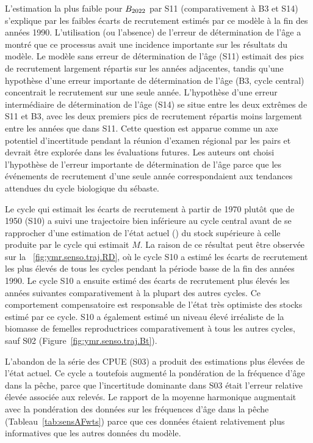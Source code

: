\documentclass[11pt]{book}
\begin{document}
L'estimation la plus faible pour $B_{2022}$ par S11 (comparativement \`{a} B3 et S14) s'explique par les faibles \'{e}carts de recrutement estim\'{e}s par ce mod\`{e}le \`{a} la fin des ann\'{e}es 1990.
L'utilisation (ou l'absence) de l'erreur de d\'{e}termination de l'\^{a}ge a montr\'{e} que ce processus avait une incidence importante sur les r\'{e}sultats du mod\`{e}le. 
Le mod\`{e}le sans erreur de d\'{e}termination de l'\^{a}ge (S11) estimait des pics de recrutement largement r\'{e}partis sur les ann\'{e}es adjacentes, tandis qu'une hypoth\`{e}se d'une erreur importante de d\'{e}termination de l'\^{a}ge (B3, cycle central) concentrait le recrutement sur une seule ann\'{e}e. L'hypoth\`{e}se d'une erreur interm\'{e}diaire de d\'{e}termination de l'\^{a}ge (S14) se situe entre les deux extr\^{e}mes de S11 et B3, avec les deux premiers pics de recrutement r\'{e}partis moins largement entre les ann\'{e}es que dans S11.
Cette question est apparue comme un axe potentiel d'incertitude pendant la r\'{e}union d'examen r\'{e}gional par les pairs et devrait \^{e}tre explor\'{e}e dans les \'{e}valuations futures. Les auteurs ont choisi l'hypoth\`{e}se de l'erreur importante de d\'{e}termination de l'\^{a}ge parce que les \'{e}v\'{e}nements de recrutement d'une seule ann\'{e}e correspondaient aux tendances attendues du cycle biologique du s\'{e}baste. 

Le cycle qui estimait les \'{e}carts de recrutement \`{a} partir de 1970 plut\^{o}t que de 1950 (S10) a suivi une trajectoire bien inf\'{e}rieure au cycle central avant de se rapprocher d'une estimation de l'\'{e}tat actuel (\currYear) du stock sup\'{e}rieure \`{a} celle produite par le cycle qui estimait $M$.
La raison de ce r\'{e}sultat peut \^{e}tre observ\'{e}e sur la ~\ref{fig:ymr.senso.traj.RD}, o\`{u} le cycle S10 a estim\'{e} les \'{e}carts de recrutement les plus \'{e}lev\'{e}s de tous les cycles pendant la p\'{e}riode basse de la fin des ann\'{e}es 1990. 
Le cycle S10 a ensuite estim\'{e} des \'{e}carts de recrutement plus \'{e}lev\'{e}s les ann\'{e}es suivantes comparativement \`{a} la plupart des autres cycles. Ce comportement compensatoire est responsable de l'\'{e}tat tr\`{e}s optimiste des stocks estim\'{e} par ce cycle. 
S10 a \'{e}galement estim\'{e} un niveau \'{e}lev\'{e} irr\'{e}aliste de la biomasse de femelles reproductrices comparativement \`{a} tous les autres cycles, sauf S02 (Figure~\ref{fig:ymr.senso.traj.Bt}).

L'abandon de la s\'{e}rie des CPUE (S03) a produit des estimations plus \'{e}lev\'{e}es de l'\'{e}tat actuel. Ce cycle a toutefois augment\'{e} la pond\'{e}ration de la fr\'{e}quence d'\^{a}ge dans la p\^{e}che, parce que l'incertitude dominante dans S03 \'{e}tait l'erreur relative \'{e}lev\'{e}e associ\'{e}e aux relev\'{e}s.
Le rapport de la moyenne harmonique augmentait avec la pond\'{e}ration des donn\'{e}es sur les fr\'{e}quences d'\^{a}ge dans la p\^{e}che (Tableau~\ref{tab:sensAFwts}) parce que ces donn\'{e}es \'{e}taient relativement plus informatives que les autres donn\'{e}es du mod\`{e}le.
\end{document}
